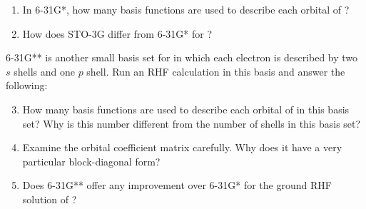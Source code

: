 			\begin{Task}
				\begin{enumerate}[topsep=0pt,itemsep=-1ex,partopsep=1ex,parsep=1ex,label=(\alph*)]
					\item In 6-31G*, how many basis functions are used to describe each orbital of ?
					\item How does STO-3G differ from 6-31G* for ?
				\end{enumerate}
				
				6-31G** is another small basis set for  in which each electron is described by two $s$ shells and one $p$ shell. Run an RHF calculation in this basis and answer the following:
					\begin{enumerate}[topsep=0pt,itemsep=-1ex,partopsep=1ex,parsep=1ex,label=(\alph*)]
							\setcounter{enumi}{2}
							\item How many basis functions are used to describe each orbital of  in this basis set? Why is this number different from the number of shells in this basis set?
							\item Examine the orbital coefficient matrix carefully. Why does it have a very particular block-diagonal form?
							\item Does 6-31G** offer any improvement over 6-31G* for the ground RHF solution of ?
					\end{enumerate}
			\end{Task}